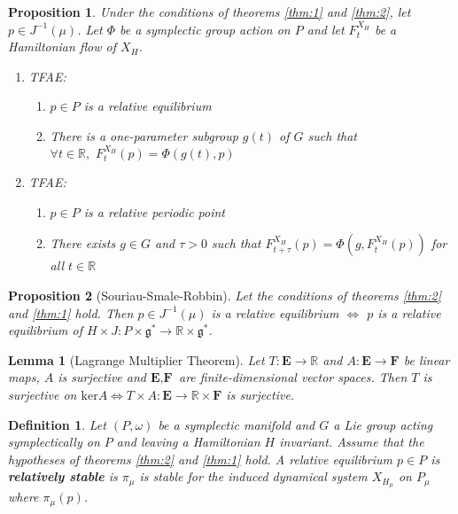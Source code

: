 \documentclass{article}
\newtheorem{defn}{Definition}
\newtheorem{prop}{Proposition}
\newtheorem{lem}{Lemma}
\begin{document}
\begin{prop}

Under the conditions of theorems \ref{thm:1} and \ref{thm:2}, let $p \in J^{-1}(\mu)$. Let $\Phi$ be a symplectic group action on $P$ and let $F^{X_H}_t$ be a Hamiltonian flow of $X_H$. 
\begin{enumerate}
    \item TFAE:
    \begin{enumerate}
        \item $p\in P$ is a relative equilibrium
        \item There is a one-parameter subgroup $g(t)$ of $G$ such that $\forall t \in \mathbb{R}, \hspace{4pt} F^{X_H}_t (p) = \Phi(g(t),p)$
    \end{enumerate}
    \item TFAE: 
    \begin{enumerate}
        \item $p \in P$ is a relative periodic point
        \item There exists $g \in G$ and $\tau > 0$ such that $F^{X_H}_{t+\tau} (p) = \Phi(g,F^{X_H}_t (p))$ for all $t \in \mathbb{R}$
    \end{enumerate}
\end{enumerate}

\end{prop}

\begin{prop}[Souriau-Smale-Robbin]
Let the conditions of theorems \ref{thm:2} and \ref{thm:1} hold. Then $p \in J^{-1}(\mu)$ is a relative equilibrium $\iff$ $p$ is a relative equilibrium of $H \times J : P \times \mathfrak{g}^* \to \mathbb{R} \times \mathfrak{g}^*$.
\end{prop}

\begin{lem}[Lagrange Multiplier Theorem]

Let $T: \textbf{E} \to \mathbb{R}$ and $A: \textbf{E} \to \textbf{F}$ be linear maps, $A$ is surjective and $\textbf{E}, \textbf{F}$ are finite-dimensional vector spaces. Then $T$ is surjective on $\mathrm{ker}A \iff T \times A: \textbf{E} \to \mathbb{R} \times \textbf{F}$ is surjective.
\end{lem}

\begin{defn}
Let $(P, \omega)$ be a symplectic manifold and $G$ a Lie group acting symplectically on $P$ and leaving a Hamiltonian $H$ invariant. Assume that the hypotheses of theorems \ref{thm:2} and \ref{thm:1} hold. A relative equilibrium $p \in P$ is \textbf{relatively stable} is $\pi_{\mu}$ is stable for the induced dynamical system $X_{H_{\mu}}$ on $P_{\mu}$ where $\pi_{\mu}(p)$.
\end{defn}
\end{document}
